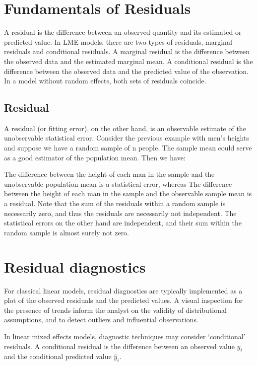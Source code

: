 \documentclass[Main.tex]{subfiles}
\begin{document}
\section{ Fundamentals of Residuals}


A residual is the difference between an observed quantity and its
estimated or predicted value. In LME models, there are two types
of residuals, marginal residuals and conditional residuals. A
marginal residual is the difference between the observed data and
the estimated marginal mean. A conditional residual is the
difference between the observed data and the predicted value of
the observation. In a model without random effects, both sets of
residuals coincide.

\subsection{Residual}
A residual (or fitting error), on the other hand, is an observable estimate of the unobservable statistical error. Consider the previous example with men's heights and suppose we have a random sample of n people. The sample mean could serve as a good estimator of the population mean. Then we have:

The difference between the height of each man in the sample and the unobservable population mean is a statistical error, whereas
The difference between the height of each man in the sample and the observable sample mean is a residual.
Note that the sum of the residuals within a random sample is necessarily zero, and thus the residuals are necessarily not independent. The statistical errors on the other hand are independent, and their sum within the random sample is almost surely not zero.


\section{Residual diagnostics} %
For classical linear models, residual diagnostics are typically implemented as a plot of the observed residuals and the predicted values. A visual inspection for the presence of trends inform the analyst on the validity of distributional assumptions, and to detect outliers and influential observations.

In linear mixed effects models, diagnostic techniques may consider `conditional' residuals. A conditional residual is the difference between an observed value $y_{i}$ and the conditional predicted value $\hat{y}_{i} $.
\end{document}
